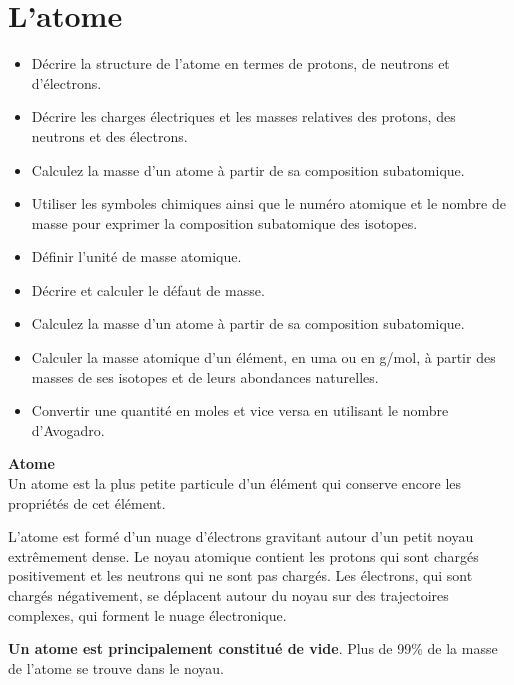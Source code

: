 \documentclass[
  11pt,
  a4paper,
  openany]{book}
\providecommand{\tightlist}{%
  \setlength{\itemsep}{0pt}\setlength{\parskip}{0pt}}
\begin{document}
\chapter{L'atome}\label{latome}

\begin{objectives}

\begin{itemize}
\tightlist
\item
  Décrire la structure de l'atome en termes de protons, de neutrons et d'électrons.
\item
  Décrire les charges électriques et les masses relatives des protons, des neutrons et des électrons.
\item
  Calculez la masse d'un atome à partir de sa composition subatomique.
\item
  Utiliser les symboles chimiques ainsi que le numéro atomique et le nombre de masse pour exprimer la composition subatomique des isotopes.
\item
  Définir l'unité de masse atomique.
\item
  Décrire et calculer le défaut de masse.
\item
  Calculez la masse d'un atome à partir de sa composition subatomique.
\item
  Calculer la masse atomique d'un élément, en uma ou en g/mol, à partir des masses de ses isotopes et de leurs abondances naturelles.
\item
  Convertir une quantité en moles et vice versa en utilisant le nombre d'Avogadro.
\end{itemize}

\end{objectives}

\begin{tcolorbox}
\textbf{Atome}\\
Un atome est la plus petite particule d'un élément qui conserve encore les propriétés de cet élément.

\end{tcolorbox}

L'atome est formé d'un nuage d'électrons gravitant autour d'un petit noyau extrêmement dense. Le noyau atomique contient les protons qui sont chargés positivement et les neutrons qui ne sont pas chargés. Les électrons, qui sont chargés négativement, se déplacent autour du noyau sur des trajectoires complexes, qui forment le nuage électronique.

\textbf{Un atome est principalement constitué de vide}. Plus de 99\% de la masse de l'atome se trouve dans le noyau.
\end{document}
